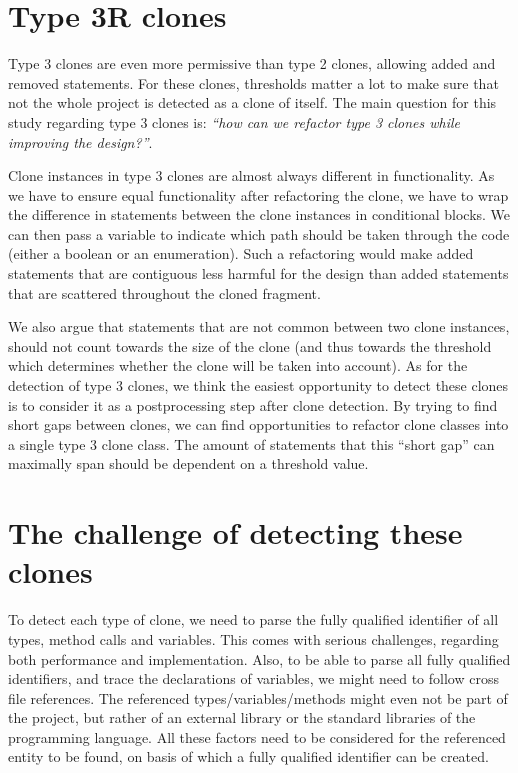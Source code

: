 \section{Type 3R clones}
Type 3 clones are even more permissive than type 2 clones, allowing added and removed statements. For these clones, thresholds matter a lot to make sure that not the whole project is detected as a clone of itself. The main question for this study regarding type 3 clones is: \textit{``how can we refactor type 3 clones while improving the design?''}.

Clone instances in type 3 clones are almost always different in functionality. As we have to ensure equal functionality after refactoring the clone, we have to wrap the difference in statements between the clone instances in conditional blocks. We can then pass a variable to indicate which path should be taken through the code (either a boolean or an enumeration). Such a refactoring would make added statements that are contiguous less harmful for the design than added statements that are scattered throughout the cloned fragment.

We also argue that statements that are not common between two clone instances, should not count towards the size of the clone (and thus towards the threshold which determines whether the clone will be taken into account). As for the detection of type 3 clones, we think the easiest opportunity to detect these clones is to consider it as a postprocessing step after clone detection. By trying to find short gaps between clones, we can find opportunities to refactor clone classes into a single type 3 clone class. The amount of statements that this ``short gap'' can maximally span should be dependent on a threshold value.

\section{The challenge of detecting these clones}\label{chap:challenge}
To detect each type of clone, we need to parse the fully qualified identifier of all types, method calls and variables. This comes with serious challenges, regarding both performance and implementation. Also, to be able to parse all fully qualified identifiers, and trace the declarations of variables, we might need to follow cross file references. The referenced types/variables/methods might even not be part of the project, but rather of an external library or the standard libraries of the programming language. All these factors need to be considered for the referenced entity to be found, on basis of which a fully qualified identifier can be created.


